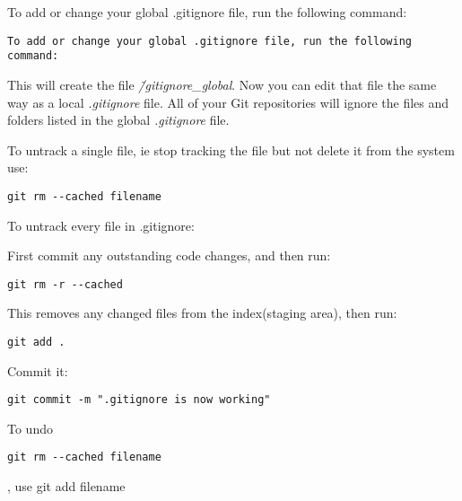\documentclass[12pt,a4paper]{article}
\begin{document}
To add or change your global .gitignore file, run the following command:

\begin{verbatim}
To add or change your global .gitignore file, run the following command:
\end{verbatim}

This will create the file  \textit{\~/gitignore\_global}. Now you can edit that file the same way as a local \textit{.gitignore} file. All of your Git repositories will ignore the files and folders listed in the global \textit{.gitignore} file.

To untrack a single file, ie stop tracking the file but not delete it from the system use:
\begin{verbatim}
git rm --cached filename
\end{verbatim}
To untrack every file in .gitignore:

First commit any outstanding code changes, and then run:
\begin{verbatim}
git rm -r --cached
\end{verbatim}
This removes any changed files from the index(staging area), then run:
\begin{verbatim}
git add .
\end{verbatim}
Commit it:
\begin{verbatim}
git commit -m ".gitignore is now working"
\end{verbatim}
To undo \begin{verbatim}git rm --cached filename\end{verbatim}, use git add filename
\end{document}
